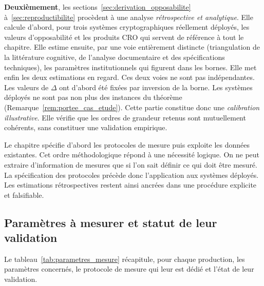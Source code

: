 \begin{sloppypar}
\textbf{Deuxi\`emement}, les
sections~\ref{sec:derivation_opposabilite}
\`a~\ref{sec:reproductibilite} proc\`edent \`a une analyse
\emph{r\'etrospective et analytique}. Elle calcule d'abord, pour trois
syst\`emes cryptographiques r\'eellement d\'eploy\'es, les valeurs
d'opposabilit\'e et les produits CRO qui servent de r\'ef\'erence \`a tout le
chapitre. Elle estime ensuite, par une voie enti\`erement distincte (triangulation de la litt\'erature cognitive, de l'analyse documentaire et des
sp\'ecifications techniques), les param\`etres institutionnels qui
figurent dans les bornes. Elle met enfin les deux estimations en regard. Ces deux voies
ne sont pas ind\'ependantes. Les valeurs de $\Delta$ ont d'abord \'et\'e fix\'ees
par inversion de la borne. Les syst\`emes d\'eploy\'es ne sont pas non plus des
instances du th\'eor\`eme (Remarque~\ref{rem:portee_cas_etude}). Cette partie
constitue donc une \emph{calibration illustrative}. Elle v\'erifie que les ordres
de grandeur retenus sont mutuellement coh\'erents, sans constituer une validation
empirique.

Le chapitre sp\'ecifie d'abord les protocoles de mesure puis exploite les donn\'ees existantes.
Cet ordre m\'ethodologique r\'epond \`a une n\'ecessit\'e logique. On ne peut extraire
d'information de mesures que si l'on sait d\'efinir ce qui doit \^etre mesur\'e.
La sp\'ecification des protocoles pr\'ec\`ede donc l'application aux
syst\`emes d\'eploy\'es. Les estimations r\'etrospectives restent ainsi ancr\'ees
dans une proc\'edure explicite et falsifiable.

\subsection{Param\`etres \`a mesurer et statut de leur validation}
\label{subsec:parametres_mesurer}

Le tableau~\ref{tab:parametres_mesure} r\'ecapitule, pour chaque production,
les param\`etres concern\'es, le protocole de mesure qui leur est d\'edi\'e et
l'\'etat de leur validation.


\end{sloppypar}
